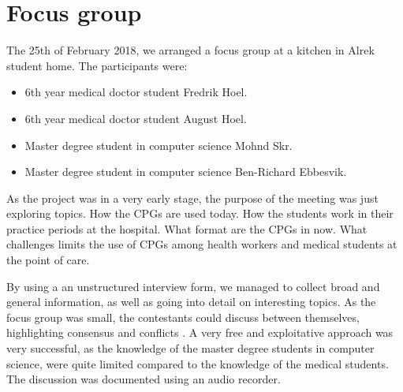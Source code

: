 \section{Focus group}
The 25th of February 2018, we arranged a focus group at a kitchen in Alrek student home. The participants were:
\begin{itemize}
	\item 6th year medical doctor student Fredrik Hoel.
	\item 6th year medical doctor student August Hoel.
	\item Master degree student in computer science Mohnd Skr.
	\item Master degree student in computer science Ben-Richard Ebbesvik.
\end{itemize}

As the project was in a very early stage, the purpose of the meeting was just exploring topics. How the CPGs are used today. How the students work in their practice periods at the hospital. What format are the CPGs in now. What challenges limits the use of CPGs among health workers and medical students at the point of care.

By using a an unstructured interview form, we managed to collect broad and general information, as well as going into detail on interesting topics. As the focus group was small, the contestants could discuss between themselves, highlighting consensus and conflicts \cite{Preece2015}. A very free and exploitative approach was very successful, as the knowledge of the master degree students in computer science, were quite limited compared to the knowledge of the medical students. The discussion was documented using an audio recorder.

